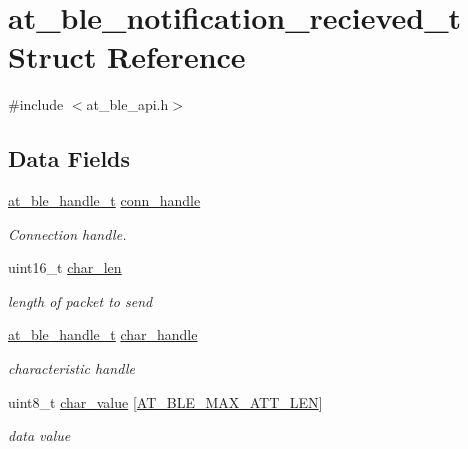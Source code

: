 \hypertarget{structat__ble__notification__recieved__t}{}\section{at\+\_\+ble\+\_\+notification\+\_\+recieved\+\_\+t Struct Reference}
\label{structat__ble__notification__recieved__t}


{\ttfamily \#include $<$at\+\_\+ble\+\_\+api.\+h$>$}

\subsection*{Data Fields}
\begin{DoxyCompactItemize}
\item 
\mbox{\hyperlink{at__ble__api_8h_abd23646d0c662860741f787efc8456f2}{at\+\_\+ble\+\_\+handle\+\_\+t}} \mbox{\hyperlink{structat__ble__notification__recieved__t_ae42df6fd8493f8f8faeccfdd6062e96f}{conn\+\_\+handle}}
\begin{DoxyCompactList}\small\item\em Connection handle. \end{DoxyCompactList}\item 
uint16\+\_\+t \mbox{\hyperlink{structat__ble__notification__recieved__t_a0fbd6e42ec188c22bdf8c86749e4e32e}{char\+\_\+len}}
\begin{DoxyCompactList}\small\item\em length of packet to send \end{DoxyCompactList}\item 
\mbox{\hyperlink{at__ble__api_8h_abd23646d0c662860741f787efc8456f2}{at\+\_\+ble\+\_\+handle\+\_\+t}} \mbox{\hyperlink{structat__ble__notification__recieved__t_abf2dd98b1df5d9471f3e18780eb5e5a7}{char\+\_\+handle}}
\begin{DoxyCompactList}\small\item\em characteristic handle \end{DoxyCompactList}\item 
uint8\+\_\+t \mbox{\hyperlink{structat__ble__notification__recieved__t_a3087f6044198797c737a35950732fbe7}{char\+\_\+value}} \mbox{[}\mbox{\hyperlink{at__ble__api_8h_aef91d9f37b950f3551cde0f9f5b01c50}{A\+T\+\_\+\+B\+L\+E\+\_\+\+M\+A\+X\+\_\+\+A\+T\+T\+\_\+\+L\+EN}}\mbox{]}
\begin{DoxyCompactList}\small\item\em data value \end{DoxyCompactList}\end{DoxyCompactItemize}


